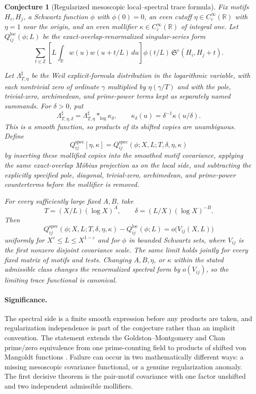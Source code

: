 \documentclass[11pt]{article}
\newtheorem{conjecture}{Conjecture}
\newcommand{\Z}{\mathbb Z}
\newcommand{\R}{\mathbb R}
\newcommand{\SG}{\mathfrak S}
\newcommand{\eps}{\varepsilon}
\begin{document}
\begin{conjecture}[Regularized mesoscopic local--spectral trace formula]\label{c3}
Fix motifs $H_i,H_j$, a Schwartz function $\phi$ with $\phi(0)=0$, an even cutoff
$\eta\in C_c^\infty(\R)$ with $\eta=1$ near the origin, and an even mollifier
$\kappa\in C_c^\infty(\R)$ of integral one.  Let
$Q^{\mathrm{loc}}_{ij}(\phi;L)$ be the exact-overlap-renormalized singular-series form
\[
 \sum_{t\in\Z}
 \left[L\int_{\R}w(u)w(u+t/L)\,du\right]
 \phi(t/L)\,\SG^{\mathrm c}(H_i,H_j+t).
\]

Let $\Lambda_{T,\eta}^{\sharp}$ be the Weil explicit-formula distribution in the
logarithmic variable, with each nontrivial zero of ordinate $\gamma$ multiplied by
$\eta(\gamma/T)$ and with the pole, trivial-zero, archimedean, and prime-power terms
kept as separately named summands.  For $\delta>0$, put
\[
 \Lambda_{T,\eta,\delta}^{\sharp}
   =\Lambda_{T,\eta}^{\sharp}*_{\log}\kappa_\delta,
 \qquad \kappa_\delta(u)=\delta^{-1}\kappa(u/\delta).
\]
This is a smooth function, so products of its shifted copies are unambiguous.  Define
\[
 Q^{\mathrm{spec}}_{ij}[\eta,\kappa]
 =Q^{\mathrm{spec}}_{ij}(\phi;X,L;T,\delta,\eta,\kappa)
\]
by inserting these mollified copies into the smoothed motif covariance, applying the
same exact-overlap M\"obius
projection as on the local side, and subtracting the explicitly specified pole,
diagonal, trivial-zero, archimedean, and prime-power counterterms before the mollifier
is removed.

For every sufficiently large fixed $A,B$, take
\[
 T=(X/L)(\log X)^A,
 \qquad
 \delta=(L/X)(\log X)^{-B}.
\]
Then
\[
 Q^{\mathrm{spec}}_{ij}(\phi;X,L;T,\delta,\eta,\kappa)
 -Q^{\mathrm{loc}}_{ij}(\phi;L)
 =o\bigl(V_{ij}(X,L)\bigr)
\]
uniformly for $X^\eps\le L\le X^{1-\eps}$ and for $\phi$ in bounded Schwartz sets,
where $V_{ij}$ is the first nonzero disjoint covariance scale.  The same limit holds
jointly for every fixed matrix of motifs and tests.  Changing $A,B,\eta$, or $\kappa$
within the stated admissible class changes the renormalized spectral form by
$o(V_{ij})$, so the limiting trace functional is canonical.
\end{conjecture}

\paragraph{Significance.}
The spectral side is a finite smooth expression before any products are taken, and
regularization independence is part of the conjecture rather than an implicit
convention.  The statement extends the Goldston--Montgomery and Chan prime/zero
equivalence from one prime-counting field to products of shifted von Mangoldt functions
\cite{GM,Chan}.  Failure can occur in two mathematically different ways: a missing
mesoscopic covariance functional, or a genuine regularization anomaly.  The first
decisive theorem is the pair-motif covariance with one factor unshifted and two
independent admissible mollifiers.
\end{document}
